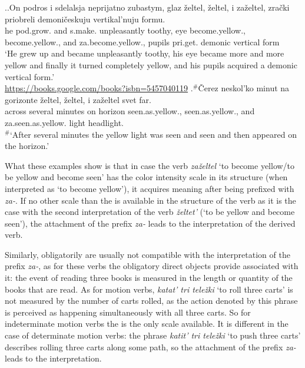 \ex.\label{ex:zazeltet:test}\ag.\label{ex:zazeltet:test1}On podros i sdelalsja neprijatno zubastym, glaz \v{z}eltel, \v{z}eltel, i za\v{z}eltel, zra\v{c}ki priobreli demoni\v{c}eskuju vertikal'nuju formu.\\
he pod.grow. and s.make. unpleasantly toothy, eye become.yellow., become.yellow., and za.become.yellow., pupils pri.get. demonic vertical form\\
\trans `He grew up and became unpleasantly toothy, his eye became more and more yellow and finally it turned completely yellow, and his pupils acquired a demonic vertical form.'\\\hbox{}\hfill\hbox{\url{https://books.google.com/books?isbn=5457040119}}
\bg.$^\#$\v{C}erez neskol'ko minut na gorizonte \v{z}eltel, \v{z}eltel, i za\v{z}eltel svet far.\label{ex:zazeltet:test2}\\
across several minutes on horizon seen.as.yellow., seen.as.yellow., and za.seen.as.yellow. light headlight.\\
\trans $^\#$`After several minutes the yellow light was seen and seen and then appeared on the horizon.'

What these examples show is that in case the verb \textit{za\v{z}eltel} `to become yellow/to be yellow and become seen' has the color intensity scale in its structure (when interpreted as `to become yellow'), it acquires  meaning after being prefixed with \textit{za-}. If no other scale than the  is available in the structure of the verb as it is the case with the second interpretation of the verb \textit{\v{z}eltet'} (`to be yellow and become seen'), the attachment of the prefix \textit{za-} leads to the  interpretation of the derived verb.

Similarly, obligatorily  are usually not compatible with the  interpretation of the prefix \textit{za-}, as for these verbs the obligatory direct objects provide  associated with it: the event of reading three books is measured in the  length or quantity of the books that are read. As for motion verbs, \textit{katat' tri tele\v{z}ki} `to roll three carts' is not measured by the number of carts rolled, as the action denoted by this phrase is perceived as happening simultaneously with all three carts. So for indeterminate motion verbs the  is the only scale available. It is different in the case of determinate motion verbs: the phrase \textit{katit' tri tele\v{z}ki} `to push three carts' describes rolling three carts along some path, so the attachment of the prefix \textit{za-} leads to the  interpretation.

